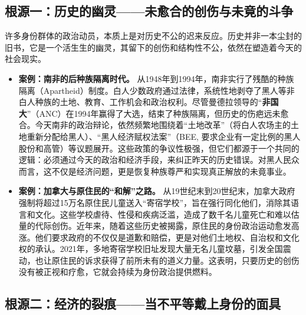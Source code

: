 \subsection{根源一：历史的幽灵——未愈合的创伤与未竟的斗争}

许多身份群体的政治动员，本质上是对历史不公的迟来反应。历史并非一本尘封的旧书，它是一个活生生的幽灵，其留下的创伤和结构性不公，依然在塑造着今天的社会现实。
\begin{itemize}
    \item \textbf{案例：南非的后种族隔离时代。} 从1948年到1994年，南非实行了残酷的种族隔离（Apartheid）制度。白人少数政府通过法律，系统性地剥夺了黑人等非白人种族的土地、教育、工作机会和政治权利。尽管曼德拉领导的“\textbf{非国大}”（ANC）在1994年赢得了大选，结束了种族隔离，但历史的伤疤远未愈合。今天南非的政治辩论，依然频繁地围绕着“土地改革”（将白人农场主的土地重新分配给黑人）、“黑人经济赋权法案”（BEE, 要求企业有一定比例的黑人股份和高管）等议题展开。这些政策的争议性极强，但它们都源于一个共同的逻辑：必须通过今天的政治和经济手段，来纠正昨天的历史错误。对黑人民众而言，这不仅是经济问题，更是恢复种族尊严和实现真正解放的未竟事业。

    \item \textbf{案例：加拿大与原住民的“和解”之路。} 从19世纪末到20世纪末，加拿大政府强制将超过15万名原住民儿童送入“寄宿学校”，旨在强行同化他们，消除其语言和文化。这些学校虐待、性侵和疾病泛滥，造成了数千名儿童死亡和难以估量的代际创伤。近年来，随着这些历史被揭露，原住民的身份政治运动愈发高涨。他们要求政府的不仅仅是道歉和赔偿，更是对他们土地权、自治权和文化权的承认。2021年，多地寄宿学校旧址发现大量无名儿童坟墓，引发全国震动，也让原住民的诉求获得了前所未有的道义力量。这表明，只要历史的创伤没有被正视和疗愈，它就会持续为身份政治提供燃料。
\end{itemize}

\subsection{根源二：经济的裂痕——当不平等戴上身份的面具}

